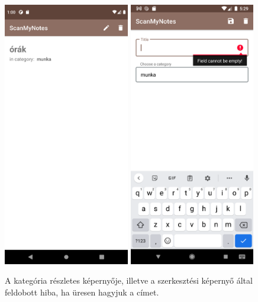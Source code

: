 \begin{figure}[!ht]
	\centering
	\includegraphics[width=55mm, keepaspectratio]{figures/category_view.png}
	\includegraphics[width=55mm, keepaspectratio]{figures/category_edit_error.png}
	\caption{A kategória részletes képernyője, illetve a szerkesztési képernyő által feldobott hiba, ha üresen hagyjuk a címet.}
	\label{fig:CategoryDetailsScreen}
\end{figure}